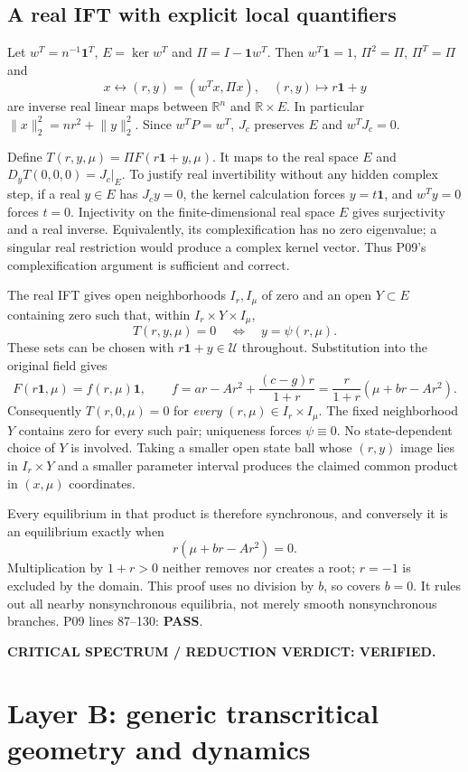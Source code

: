 \documentclass[11pt]{article}
\newcommand{\one}{\mathbf{1}}
\newcommand{\R}{\mathbb R}
\newcommand{\U}{\mathcal U}
\newcommand{\norm}[1]{\lVert#1\rVert}
\newcommand{\lin}[1]{P09 lines #1}
\newcommand{\pass}{\textbf{PASS}}
\begin{document}
\subsection{A real IFT with explicit local quantifiers}
Let $w^T=n^{-1}\one^T$, $E=\ker w^T$ and $\Pi=I-\one w^T$.
Then $w^T\one=1$, $\Pi^2=\Pi$, $\Pi^T=\Pi$ and
\[
 x\longleftrightarrow(r,y)=(w^Tx,\Pi x),\quad
 (r,y)\longmapsto r\one+y
\]
are inverse real linear maps between $\R^n$ and $\R\times E$.
In particular $\norm{x}_2^2=nr^2+\norm y_2^2$.
Since $w^TP=w^T$, $J_c$ preserves $E$ and $w^TJ_c=0$.

Define $T(r,y,\mu)=\Pi F(r\one+y,\mu)$. It maps to the real space
$E$ and $D_yT(0,0,0)=J_c|_E$. To justify real invertibility without any
hidden complex step, if a real $y\in E$ has $J_cy=0$, the kernel calculation
forces $y=t\one$, and $w^Ty=0$ forces $t=0$. Injectivity on the
finite-dimensional real space $E$ gives surjectivity and a real inverse.
Equivalently, its complexification has no zero eigenvalue; a singular real
restriction would produce a complex kernel vector. Thus P09's
complexification argument is sufficient and correct.

The real IFT gives open neighborhoods $I_r,I_\mu$ of zero and an open
$Y\subset E$ containing zero such that, within $I_r\times Y\times I_\mu$,
\[
 T(r,y,\mu)=0\quad\Longleftrightarrow\quad y=\psi(r,\mu).
\]
These sets can be chosen with $r\one+y\in\U$ throughout. Substitution into
the original field gives
\[
 F(r\one,\mu)=f(r,\mu)\one,\qquad
 f=ar-Ar^2+\frac{(c-g)r}{1+r}
   =\frac{r}{1+r}(\mu+br-Ar^2).
\]
Consequently $T(r,0,\mu)=0$ for \emph{every} $(r,\mu)\in I_r\times I_\mu$.
The fixed neighborhood $Y$ contains zero for every such pair; uniqueness
forces $\psi\equiv0$. No state-dependent choice of $Y$ is involved.
Taking a smaller open state ball whose $(r,y)$ image lies in $I_r\times Y$
and a smaller parameter interval produces the claimed common product in
$(x,\mu)$ coordinates.

Every equilibrium in that product is therefore synchronous, and conversely
it is an equilibrium exactly when
\[
 r(\mu+br-Ar^2)=0.
\]
Multiplication by $1+r>0$ neither removes nor creates a root; $r=-1$ is
excluded by the domain. This proof uses no division by $b$, so covers
$b=0$. It rules out all nearby nonsynchronous equilibria, not merely
smooth nonsynchronous branches. \lin{87--130}: \pass.

\textbf{CRITICAL SPECTRUM / REDUCTION VERDICT: VERIFIED.}

\section{Layer B: generic transcritical geometry and dynamics}
\label{sec:generic}
\end{document}
